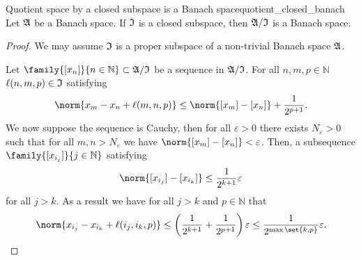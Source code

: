 \begin{lemma}{Quotient space by a closed subspace is a Banach space}{quotient_closed_banach}
    Let \(\mathfrak{A}\) be a Banach space. If \(\mathfrak{I}\) is a closed subspace, then \(\mathfrak{A}/\mathfrak{I}\) is a Banach space.
\end{lemma}
\begin{proof}
    We may assume \(\mathfrak{I}\) is a proper subspace of a non-trivial Banach space \(\mathfrak{A}\).

    Let \(\family{[x_n]}{n \in \mathbb{N}} \subset \algebra{A}/\algebra{I}\) be a sequence in \(\mathfrak{A}/\mathfrak{I}\). For all \(n,m,p \in \mathbb{N}\)  \(\ell(n,m,p) \in \mathfrak{I}\) satisfying
    \begin{equation*}
        \norm{x_m - x_n + \ell(m,n,p)} \leq \norm{[x_m] - [x_n]} + \frac{1}{2^{p+1}}.
    \end{equation*}
    We now suppose the sequence is Cauchy, then for all \(\varepsilon> 0\) there exists \(N_{\varepsilon} > 0\) such that for all \(m, n > N_{\varepsilon}\) we have \(\norm{[x_m] - [x_n]} < \varepsilon\). Then,  a subsequence \(\family{[x_{i_j}]}{j \in \mathbb{N}}\) satisfying
    \begin{equation*}
        \norm{[x_{i_j}] - [x_{i_k}]} \leq \frac{1}{2^{k+1}}\varepsilon
    \end{equation*}
    for all \(j > k\). As a result we have for all \(j > k\) and \(p \in \mathbb{N}\) that
    \begin{equation*}
        \norm{x_{i_j} - x_{i_k} + \ell(i_j, i_k, p)} \leq \left(\frac{1}{2^{k+1}} + \frac{1}{2^{p+1}}\right)\varepsilon \leq \frac{1}{2^{\max\set{k,p}}}\varepsilon.
    \end{equation*}


\end{proof}

